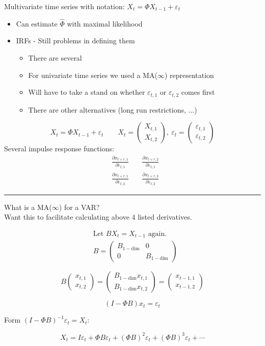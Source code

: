 Multivariate time series with notation: $X_t = \Phi X_{t-1}  +\varepsilon_t$
\begin{itemize}
    \item Can estimate $\hat{\Phi}$ with maximal likelihood
    \item IRFs - Still problems in defining them
    \begin{itemize}
        \item There are several
        \item For univariate time series we used a MA($\infty$) representation
        \item Will have to take a stand on whether $\varepsilon_{t,1}$ or $\varepsilon_{t,2}$ comes first
        \item There are other alternatives (long run restrictions, ...) 
    \end{itemize}
\end{itemize}
\[
X_t = \Phi X_{t-1} + \varepsilon_t \quad \quad X_t = \begin{pmatrix}
    X_{t,1} \\
    X_{t,2}
\end{pmatrix} ,\ \varepsilon_t = \begin{pmatrix}
    \varepsilon_{t,1}\\
    \varepsilon_{t,2}
\end{pmatrix}
\]
Several impulse response functions:
\begin{align*}
    & \frac{\partial x_{t+r, 1}}{\partial \varepsilon_{t, 1}} & \quad \frac{\partial x_{t+r, 2}}{\partial \varepsilon_{t, 1}} \\
    & \frac{\partial x_{t+r, 1}}{\partial \varepsilon_{t, 2}} & \quad \frac{\partial x_{t+r, 2}}{\partial \varepsilon_{t, 2}}
\end{align*}

\noindent
\rule{\linewidth}{0.4pt}
\noindent
What is a MA($\infty$) for a VAR?\\
Want this to facilitate calculating above 4 listed derivatives.

\begin{align*}
    & \text{Let } B X_t = X_{t-1} \text{ again.} \\
    & B = \begin{pmatrix}
    B_{1-\text{dim}} & 0 \\
    0 & B_{1-\text{dim}}
    \end{pmatrix}
\end{align*}

\[
B \begin{pmatrix}
x_{t,1} \\
x_{t,2}
\end{pmatrix}
= \begin{pmatrix}
B_{1-\text{dim}} x_{t,1} \\
B_{1-\text{dim}} x_{t,2}
\end{pmatrix}
= \begin{pmatrix}
x_{t-1,1} \\
x_{t-1,2}
\end{pmatrix}
\]

\[
(I - \Phi B) x_t = \varepsilon_t
\]

Form \((I - \Phi B)^{-1} \varepsilon_t = X_t\):

\[
X_t = I \varepsilon_t + \Phi B \varepsilon_t + (\Phi B)^2 \varepsilon_t + (\Phi B)^3 \varepsilon_t + \cdots
\]
